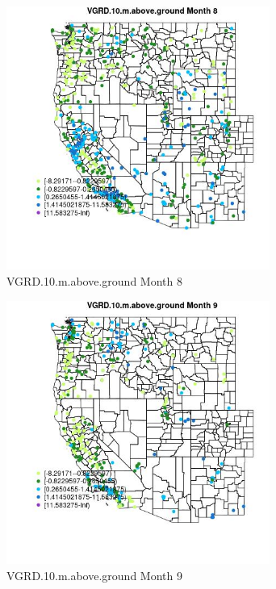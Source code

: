 \begin{figure} 
\centering  
\includegraphics[width=0.77\textwidth]{Code_Outputs/Report_ML_input_PM25_Step4_part_e_de_duplicated_aves_compiled_2019-05-18wNAs_MapObsMo8VGRD10maboveground.jpg} 
\caption{\label{fig:Report_ML_input_PM25_Step4_part_e_de_duplicated_aves_compiled_2019-05-18wNAsMapObsMo8VGRD10maboveground}VGRD.10.m.above.ground Month 8} 
\end{figure} 
 

\begin{figure} 
\centering  
\includegraphics[width=0.77\textwidth]{Code_Outputs/Report_ML_input_PM25_Step4_part_e_de_duplicated_aves_compiled_2019-05-18wNAs_MapObsMo9VGRD10maboveground.jpg} 
\caption{\label{fig:Report_ML_input_PM25_Step4_part_e_de_duplicated_aves_compiled_2019-05-18wNAsMapObsMo9VGRD10maboveground}VGRD.10.m.above.ground Month 9} 
\end{figure} 
 

